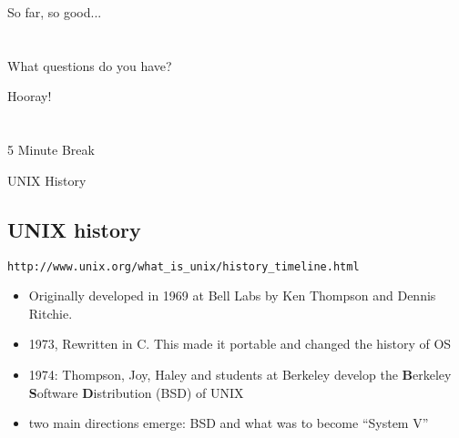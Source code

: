 \documentclass[sxga]{xdvislides}
\begin{document}
\newpage
\vspace*{\fill}
\begin{center}
    \Hugesize
        So far, so good...\\ [1em]
    \hspace*{5mm}
    \blueline\\
    \hspace*{5mm}\\
	What questions do you have?
\end{center}
\vspace*{\fill}

\newpage
\vspace*{\fill}
\begin{center}
    \Hugesize
        Hooray! \\ [1em]
    \hspace*{5mm}
    \blueline\\
    \hspace*{5mm}\\
        5 Minute Break
\end{center}
\vspace*{\fill}

\pagebreak


\vspace*{\fill}
\begin{center}
  \Hugesize
    UNIX History
	\hspace*{5mm}\blueline\\ [1em]
  \Normalsize
\end{center}
\vspace*{\fill}

\subsection{UNIX history}
\verb+http://www.unix.org/what_is_unix/history_timeline.html+ \\

\begin{itemize}
	\item Originally developed in 1969 at Bell Labs by Ken Thompson
		and Dennis Ritchie.
	\item 1973, Rewritten in C. This made it portable and changed the history of OS
	\item 1974: Thompson, Joy, Haley and students at Berkeley develop
		the {\bf B}erkeley {\bf S}oftware {\bf D}istribution (BSD) of UNIX
	\item two main directions emerge: BSD and what was to become ``System V''
\end{itemize}
\end{document}
